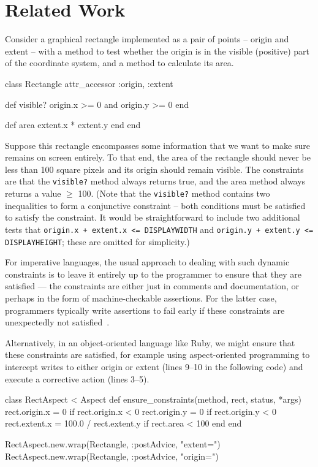 \section{Related Work}
\label{sec:related-work}
Consider a graphical rectangle implemented as a pair of points --
origin and extent -- with a method to test whether the origin is in
the visible (\ie positive) part of the coordinate system, and a
method to calculate its area.
\begin{code}
class Rectangle
  attr_accessor :origin, :extent

  def visible?
    origin.x >= 0 and origin.y >= 0
  end

  def area
    extent.x * extent.y
  end
end%
\end{code}

Suppose this rectangle encompasses some information that we want to
make sure remains on screen entirely. To that end, the area of the
rectangle should never be less than 100 square pixels and its origin
should remain visible. The constraints are that the
\lstinline{visible?} method always returns true, and the area method
always returns a value $\geq$ 100. (Note that the \lstinline{visible?}
method contains two inequalities to form a conjunctive constraint --
both conditions must be satisfied to satisfy the constraint.  It would
be straightforward to include two additional tests that
\lstinline{origin.x + extent.x <= DISPLAYWIDTH} and
\lstinline{origin.y + extent.y <= DISPLAYHEIGHT}; these are omitted
for simplicity.)

For imperative languages, the usual approach to dealing with such
dynamic constraints is to leave it entirely up to the programmer to
ensure that they are satisfied --- the constraints are either just in
comments and documentation, or perhaps in the form of
machine-checkable assertions.  For the latter case, programmers
typically write assertions to fail early if these constraints are
unexpectedly not satisfied~\cite{rinard2005exploring}.

Alternatively, 
in an object-oriented language like Ruby, we might ensure
that these constraints are satisfied, for example using
aspect-oriented programming \cite{kiczales1997aspect} to intercept
writes to either origin or extent (lines 9--10 in the following code) 
and execute a corrective action (lines 3--5).
\begin{code}
class RectAspect < Aspect
  def ensure_constraints(method, rect, status, *args)
    rect.origin.x = 0 if rect.origin.x < 0
    rect.origin.y = 0 if rect.origin.y < 0
    rect.extent.x = 100.0 / rect.extent.y if rect.area < 100
  end
end

RectAspect.new.wrap(Rectangle, :postAdvice, "extent=")
RectAspect.new.wrap(Rectangle, :postAdvice, "origin=")
\end{code}

